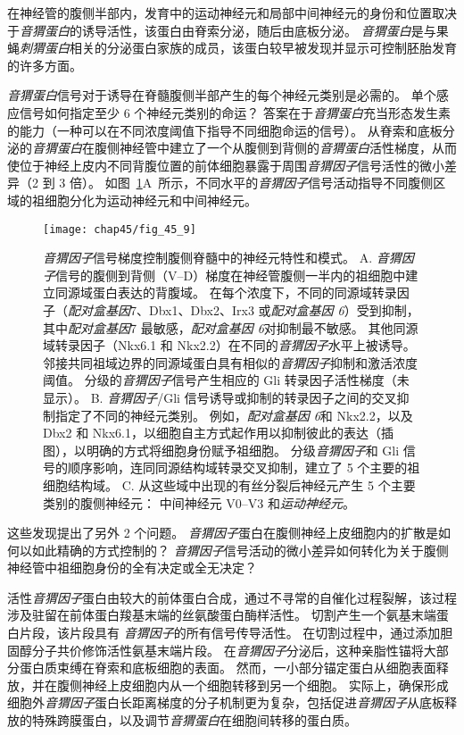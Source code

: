 在神经管的腹侧半部内，发育中的运动神经元和局部中间神经元的身份和位置取决于\textit{音猬蛋白}的诱导活性，该蛋白由脊索分泌，随后由底板分泌。
\textit{音猬蛋白}是与果蝇\textit{刺猬蛋白}相关的分泌蛋白家族的成员，该蛋白较早被发现并显示可控制胚胎发育的许多方面。


\textit{音猬蛋白}信号对于诱导在脊髓腹侧半部产生的每个神经元类别是必需的。
单个感应信号如何指定至少 6 个神经元类别的命运？
答案在于\textit{音猬蛋白}充当形态发生素的能力（一种可以在不同浓度阈值下指导不同细胞命运的信号）。
从脊索和底板分泌的\textit{音猬蛋白}在腹侧神经管中建立了一个从腹侧到背侧的\textit{音猬蛋白}活性梯度，从而使位于神经上皮内不同背腹位置的前体细胞暴露于周围\textit{音猬因子}信号活性的微小差异（2 到 3 倍）。
如图~\ref{fig:45_9}A~所示，不同水平的\textit{音猬因子}信号活动指导不同腹侧区域的祖细胞分化为运动神经元和中间神经元。


\begin{figure}[htbp]
	\centering
	\texttt{[image: chap45/fig\_45\_9]}
	\caption{\textit{音猬因子}信号梯度控制腹侧脊髓中的神经元特性和模式。
		A. \textit{音猬因子}信号的腹侧到背侧（V–D）梯度在神经管腹侧一半内的祖细胞中建立同源域蛋白表达的背腹域。
		在每个浓度下，不同的同源域转录因子（\textit{配对盒基因}7、Dbx1、Dbx2、Irx3 或\textit{配对盒基因 6}）受到抑制，其中\textit{配对盒基因}7 最敏感，\textit{配对盒基因 6}对抑制最不敏感。
		其他同源域转录因子（Nkx6.1 和 Nkx2.2）在不同的\textit{音猬因子}水平上被诱导。
		邻接共同祖域边界的同源域蛋白具有相似的\textit{音猬因子}抑制和激活浓度阈值。
		分级的\textit{音猬因子}信号产生相应的 Gli 转录因子活性梯度（未显示）。
		B. \textit{音猬因子}/Gli 信号诱导或抑制的转录因子之间的交叉抑制指定了不同的神经元类别。
		例如，\textit{配对盒基因 6}和 Nkx2.2，以及 Dbx2 和 Nkx6.1，以细胞自主方式起作用以抑制彼此的表达（插图），以明确的方式将细胞身份赋予祖细胞。
		分级\textit{音猬因子}和 Gli 信号的顺序影响，连同同源结构域转录交叉抑制，建立了 5 个主要的祖细胞结构域。
		C. 从这些域中出现的有丝分裂后神经元产生 5 个主要类别的腹侧神经元：
		中间神经元 V0–V3 和\textit{运动神经元}。}
	\label{fig:45_9}
\end{figure}


这些发现提出了另外 2 个问题。
\textit{音猬因子}蛋白在腹侧神经上皮细胞内的扩散是如何以如此精确的方式控制的？
\textit{音猬因子}信号活动的微小差异如何转化为关于腹侧神经管中祖细胞身份的全有决定或全无决定？


活性\textit{音猬因子}蛋白由较大的前体蛋白合成，通过不寻常的自催化过程裂解，该过程涉及驻留在前体蛋白羧基末端的丝氨酸蛋白酶样活性。
切割产生一个氨基末端蛋白片段，该片段具有 \textit{音猬因子}的所有信号传导活性。
在切割过程中，通过添加胆固醇分子共价修饰活性氨基末端片段。
在\textit{音猬因子}分泌后，这种亲脂性锚将大部分蛋白质束缚在脊索和底板细胞的表面。
然而，一小部分锚定蛋白从细胞表面释放，并在腹侧神经上皮细胞内从一个细胞转移到另一个细胞。
实际上，确保形成细胞外\textit{音猬因子}蛋白长距离梯度的分子机制更为复杂，包括促进\textit{音猬因子}从底板释放的特殊跨膜蛋白，以及调节\textit{音猬蛋白}在细胞间转移的蛋白质。


